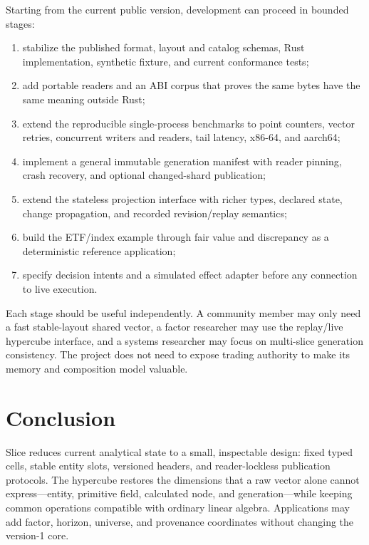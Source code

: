 \documentclass{strategynet-journal}
\newcommand{\SLICE}{\textsf{Slice}}
\begin{document}
\begin{SNcolumns}
Starting from the current public version, development can proceed in bounded
stages:
\begin{enumerate}
  \item stabilize the published format, layout and catalog schemas, Rust
        implementation, synthetic fixture, and current conformance tests;
  \item add portable readers and an ABI corpus that proves the same bytes have
        the same meaning outside Rust;
  \item extend the reproducible single-process benchmarks to point counters,
        vector retries, concurrent writers and readers, tail latency, x86-64,
        and aarch64;
  \item implement a general immutable generation manifest with reader pinning,
        crash recovery, and optional changed-shard publication;
  \item extend the stateless projection interface with richer types, declared
        state, change propagation, and recorded revision/replay semantics;
  \item build the ETF/index example through fair value and discrepancy as a
        deterministic reference application;
  \item specify decision intents and a simulated effect adapter before any
        connection to live execution.
\end{enumerate}

Each stage should be useful independently.  A community member may only need a
fast stable-layout shared vector, a factor researcher may use the replay/live
hypercube interface, and a systems researcher may focus on multi-slice
generation consistency.  The project does not need to expose trading authority
to make its memory and composition model valuable.

\section{Conclusion}

\SLICE{} reduces current analytical state to a small, inspectable design: fixed
typed cells, stable entity slots, versioned headers, and
reader-lockless publication protocols.  The hypercube restores the dimensions
that a raw vector alone cannot express---entity, primitive field, calculated
node, and generation---while keeping common operations compatible with
ordinary linear algebra.  Applications may add factor, horizon, universe, and
provenance coordinates without changing the version-1 core.


\end{SNcolumns}
\end{document}
